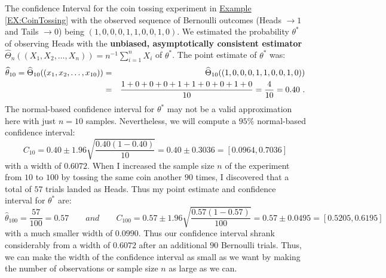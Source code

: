 \begin{example}
The confidence Interval for the coin tossing experiment in \hyperref[EX:CoinTossing]{Example \ref*{EX:CoinTossing}} with the observed sequence of Bernoulli outcomes (Heads $\to 1$ and Tails $\to 0$) being $(1,0,0,0,1,1,0,0,1,0)$.  We estimated the probability $\theta^*$ of observing Heads with the {\bf unbiased, asymptotically consistent estimator} $\widehat{\Theta}_n((X_1,X_2,\ldots,X_n))=n^{-1}\sum_{i=1}^{n} X_i$ of $\theta^*$.  The point estimate of $\theta^*$ was:
\begin{eqnarray}
\widehat{\theta}_{10} = \widehat{\Theta}_{10}((x_1,x_2,\ldots,x_{10})) 
&=&\widehat{\Theta}_{10}((1,0,0,0,1,1,0,0,1,0)) \notag \\
&=& \frac{1+0+0+0+1+1+0+0+1+0}{10}=\frac{4}{10}=0.40 \notag \ .
\end{eqnarray}
The normal-based confidence interval for $\theta^*$ may not be a valid approximation here with just $n=10$ samples.  Nevertheless, we will compute a $95\%$ normal-based confidence interval:
\[
C_{10} 
= 0.40 \pm 1.96 \sqrt{\frac{0.40(1-0.40)}{10}}
=0.40 \pm 0.3036
=[0.0964, 0.7036]
\]
with a width of $0.6072$.  When I increased the sample size $n$ of the experiment from $10$ to $100$ by tossing the same coin another $90$ times, I discovered that a total of $57$ trials landed as Heads.  Thus my point estimate and confidence interval for $\theta^*$ are:
\[
\widehat{\theta}_{100} = \frac{57}{100} = 0.57 \qquad and \qquad
C_{100} 
= 0.57 \pm 1.96 \sqrt{\frac{0.57(1-0.57)}{100}}
 = 0.57 \pm 0.0495
 =[0.5205, 0.6195]
\]
with a much smaller width of $0.0990$.  Thus our confidence interval shrank considerably from a width of $0.6072$ after an additional $90$ Bernoulli trials.  Thus, we can make the width of the confidence interval as small as we want by making the number of observations or sample size $n$ as large as we can.
\end{example}

